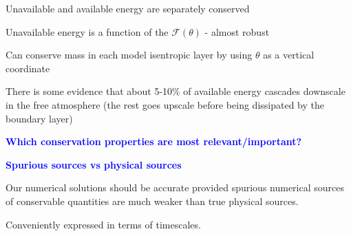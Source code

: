 \documentclass[a4]{seminar}
\newcommand{\B}[1]{\textcolor{blue}{#1}}
\begin{document}

\begin{slide}

Unavailable and available energy are separately conserved

\vspace{3mm}

Unavailable energy is a function of the \( \mathcal{F}(\theta) \) - almost robust

\vspace{3mm}

Can conserve mass in each model isentropic layer by using \( \theta \) as
a vertical coordinate

\vspace{3mm}

There is some evidence that about 5-10\% of available energy
cascades downscale in the free atmosphere (the rest goes upscale before
being dissipated by the boundary layer)



\end{slide}


\begin{slide}


\B{\bf Which conservation properties are most relevant/important?}

\vspace{2mm}

\B{\bf Spurious sources vs physical sources} 

\vspace{3mm}

Our numerical solutions should be accurate provided
spurious numerical sources of conservable quantities
are much weaker than true physical sources.

\vspace{2mm}

Conveniently expressed in terms of timescales.



\end{slide}




\end{document}
